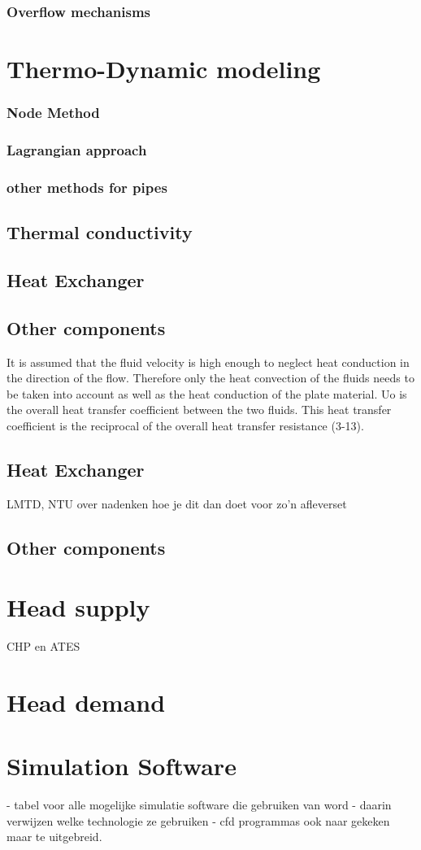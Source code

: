\subsubsection{Overflow mechanisms}
\section{Thermo-Dynamic modeling}\label{sec::thermo}
\subsubsection{Node Method}
\subsubsection{Lagrangian approach}
\subsubsection{other methods for pipes}
\subsection{Thermal conductivity}
\subsection{Heat Exchanger}
\subsection{Other components}

It is assumed that the fluid velocity is high enough to neglect heat conduction in the direction of the flow. Therefore only the heat convection of the fluids needs to be taken into account as well as the heat conduction of the plate material. Uo is the overall heat transfer coefficient between the two fluids. This heat transfer coefficient is the reciprocal of the overall heat transfer resistance (3-13). 
\subsection{Heat Exchanger}
LMTD, NTU
over nadenken hoe je dit dan doet voor zo'n afleverset
\subsection{Other components}

\section{Head supply}
CHP en ATES

\section{Head demand}


\section{Simulation Software}
- tabel voor alle mogelijke simulatie software die gebruiken van word
- daarin verwijzen welke technologie ze gebruiken
- cfd programmas ook naar gekeken maar te uitgebreid. 

